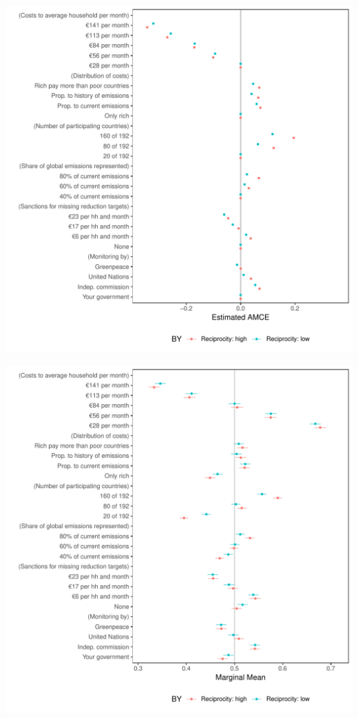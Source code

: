 \documentclass[a4paper,12pt]{article}\usepackage[]{graphicx}\usepackage[]{color}
\makeatletter
\def\maxwidth{ %
  \ifdim\Gin@nat@width>\linewidth
    \linewidth
  \else
    \Gin@nat@width
  \fi
}
\newenvironment{knitrout}{}{} %
\makeatother
\begin{document}
\begin{knitrout}
\color{fgcolor}
\includegraphics[width=\maxwidth]{figure/bechtel_subgroup_amce_reciprocity-1} 

\includegraphics[width=\maxwidth]{figure/bechtel_subgroup_amce_reciprocity-2} 

\end{knitrout}
\end{document}
